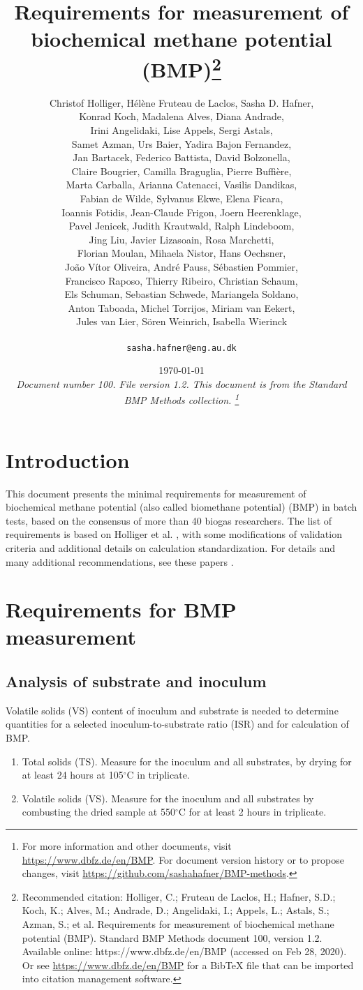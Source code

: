 \documentclass[]{article}
\title {Requirements for measurement of biochemical methane potential (BMP)\footnote{
  Recommended citation: 
Holliger, C.; Fruteau de Laclos, H.; Hafner, S.D.; Koch, K.; Alves, M.; Andrade, D.; Angelidaki, I.; Appels, L.; Astals, S.; Azman, S.; et al. Requirements for measurement of biochemical methane potential (BMP). Standard BMP Methods document 100, version 1.2. Available online: https://www.dbfz.de/en/BMP (accessed on Feb 28, 2020).
\newline
  Or see \url{https://www.dbfz.de/en/BMP} for a BibTeX file that can be imported into citation management software.
}}
\author{
Christof Holliger, 
H{\'e}l{\`e}ne Fruteau de Laclos,
Sasha D. Hafner,\\
Konrad Koch,
Madalena Alves, 
Diana Andrade,\\
Irini Angelidaki,
Lise Appels,
Sergi Astals, \\
Samet Azman,
Urs Baier,
Yadira Bajon Fernandez,\\
Jan Bartacek,
Federico Battista,
David Bolzonella,\\
Claire Bougrier,
Camilla Braguglia,
Pierre Buffi{\`e}re,\\
Marta Carballa,
Arianna Catenacci,
Vasilis Dandikas,\\
Fabian de Wilde,
Sylvanus Ekwe,
Elena Ficara,\\
Ioannis Fotidis,
Jean-Claude Frigon, 
Joern Heerenklage,\\
Pavel Jenicek,
Judith Krautwald,
Ralph Lindeboom,\\
Jing Liu,
Javier Lizasoain,
Rosa Marchetti,\\
Florian Moulan,
Mihaela Nistor,
Hans Oechsner,\\
Jo{\~a}o V{\'i}tor Oliveira,
Andr{\'e} Pauss,
S{\'e}bastien Pommier,\\
Francisco Raposo,
Thierry Ribeiro,
Christian Schaum,\\
Els Schuman,
Sebastian Schwede,
Mariangela Soldano,\\
Anton Taboada,
Michel Torrijos, 
Miriam van Eekert, \\
Jules van Lier,
S{\"o}ren Weinrich, 
Isabella Wierinck\\
\\
\texttt{sasha.hafner@eng.au.dk}
}
\date{\today \\
\bigskip
\textit{
  Document number 100.
  File version 1.2. 
  This document is from the Standard BMP Methods collection.
    \footnote{For more information and other documents, visit \url{https://www.dbfz.de/en/BMP}. 
    For document version history or to propose changes, visit \url{https://github.com/sashahafner/BMP-methods}.}
}
}
\begin{document}
\maketitle

\section{Introduction}
This document presents the minimal requirements for measurement of biochemical methane potential (also called biomethane potential) (BMP) in batch tests, based on the consensus of more than 40 biogas researchers.
The list of requirements is based on Holliger et al. \cite{iis2016}, with some modifications of validation criteria \cite{iis2020} and additional details on calculation standardization.
For details and many additional recommendations, see these papers \cite{iis2016,iis2020}.

\section{Requirements for BMP measurement}
\subsection{Analysis of substrate and inoculum}
\label{sec:analysis}
  Volatile solids (VS) content of inoculum and substrate is needed to determine quantities for a selected inoculum-to-substrate ratio (ISR) and for calculation of BMP.
  \begin{enumerate}
    \item Total solids (TS). Measure for the inoculum and all substrates, by drying for at least 24 hours at 105$^\circ$C in triplicate.
    \item Volatile solids (VS). Measure for the inoculum and all substrates by combusting the dried sample at 550$^\circ$C for at least 2 hours in triplicate.
  \end{enumerate}
\end{document}
